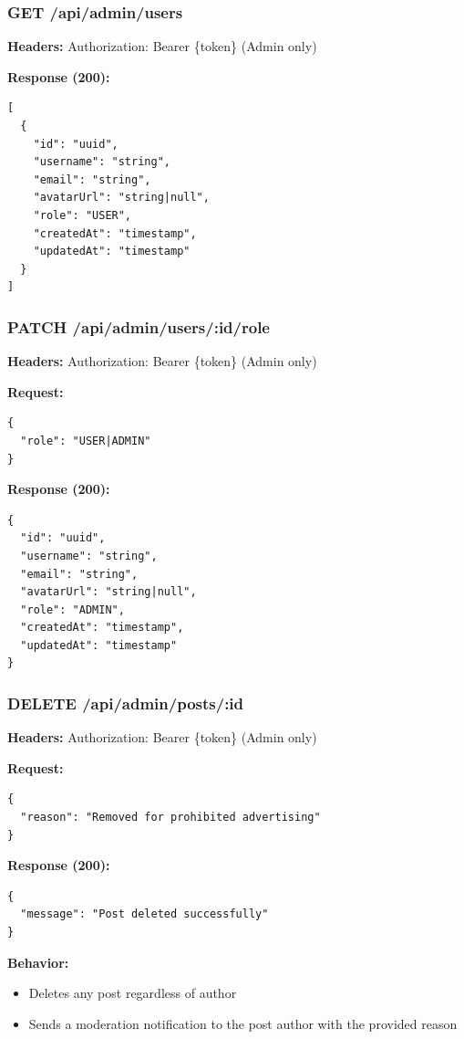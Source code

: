 \documentclass[11pt,a4paper]{article}
\begin{document}
\subsubsection{GET /api/admin/users}
\textbf{Headers:} Authorization: Bearer \{token\} (Admin only)

\textbf{Response (200):}
\begin{lstlisting}
[
  {
    "id": "uuid",
    "username": "string",
    "email": "string",
    "avatarUrl": "string|null",
    "role": "USER",
    "createdAt": "timestamp",
    "updatedAt": "timestamp"
  }
]
\end{lstlisting}

\subsubsection{PATCH /api/admin/users/:id/role}
\textbf{Headers:} Authorization: Bearer \{token\} (Admin only)

\textbf{Request:}
\begin{lstlisting}
{
  "role": "USER|ADMIN"
}
\end{lstlisting}

\textbf{Response (200):}
\begin{lstlisting}
{
  "id": "uuid",
  "username": "string",
  "email": "string",
  "avatarUrl": "string|null",
  "role": "ADMIN",
  "createdAt": "timestamp",
  "updatedAt": "timestamp"
}
\end{lstlisting}

\subsubsection{DELETE /api/admin/posts/:id}
\textbf{Headers:} Authorization: Bearer \{token\} (Admin only)

\textbf{Request:}
\begin{lstlisting}
{
  "reason": "Removed for prohibited advertising"
}
\end{lstlisting}

\textbf{Response (200):}
\begin{lstlisting}
{
  "message": "Post deleted successfully"
}
\end{lstlisting}

\textbf{Behavior:}
\begin{itemize}
    \item Deletes any post regardless of author
    \item Sends a moderation notification to the post author with the provided reason
\end{itemize}
\end{document}
